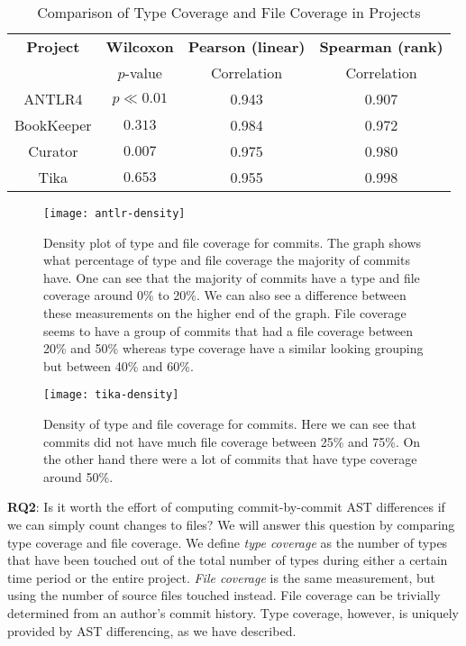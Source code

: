 \begin{table}[ht]
\renewcommand{\arraystretch}{1.3}
\caption{Comparison of Type Coverage and File Coverage in Projects}
\label{tab:summary}
\centering
\begin{tabular}{c|ccc}
\hline
\bfseries Project & \bfseries Wilcoxon& \bfseries Pearson (linear) & \bfseries Spearman (rank) \\
& $p$-value & Correlation & Correlation \\
\hline
ANTLR4 & $p\ll0.01$ & 0.943 & 0.907\\
BookKeeper & $0.313$ & 0.984 & 0.972\\
Curator & $0.007$ & 0.975 & 0.980\\
Tika & $0.653$ & 0.955 & 0.998\\
\hline
\end{tabular}
\end{table}

\begin{figure}[ht]
\centering
\texttt{[image: antlr-density]}
\caption{Density plot of type and file coverage for commits. The graph shows what percentage of type and file coverage the majority of commits have. One can see that the majority of commits have a type and file coverage around 0\% to 20\%. We can also see a difference between these measurements on the higher end of the graph. File coverage seems to have a group of commits that had a file coverage between 20\% and 50\% whereas type coverage have a similar looking grouping but between 40\% and 60\%.\label{fig:antlr4-density}}
\end{figure}

\begin{figure}[ht]
\centering
\texttt{[image: tika-density]}
\caption{Density of type and file coverage for commits. Here we can see that commits did not have much file coverage between 25\% and 75\%. On the other hand there were a lot of commits that have type coverage around 50\%.\label{fig:tika-density}}
\end{figure}

\textbf{RQ2}: Is it worth the effort of computing commit-by-commit AST differences if we can simply count changes to files? We will answer this question by comparing type coverage and file coverage. We define \emph{type coverage} as the number of types that have been touched out of the total number of types during either a certain time period or the entire project. \emph{File coverage} is the same measurement, but using the number of source files touched instead. File coverage can be trivially determined from an author's commit history. Type coverage, however, is uniquely provided by AST differencing, as we have described.

